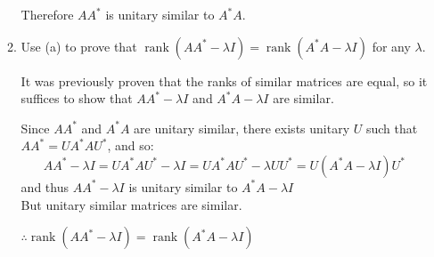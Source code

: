 \documentclass[letterpaper,12pt,fleqn]{article}
\DeclareMathOperator{\rnk}{rank}
\renewcommand{\l}{\lambda}
\newcommand{\m}{\mu}
\begin{document}
\begin{enumerate}
\begin{enumerate}
    Therefore $AA^*$ is unitary similar to $A^*A$.
    

  \item Use (a) to prove that $\rnk(AA^*-\l I)=\rnk(A^*A-\l I)$ for any $\l$.

    It was previously proven that the ranks of similar matrices are equal, so it
    suffices to show that $AA^*-\l I$ and $A^*A-\l I$ are similar.

    Since $AA^*$ and $A^*A$ are unitary similar, there exists unitary $U$ such that
    $AA^*=UA^*AU^*$, and so:
    \[AA^*-\l I=UA^*AU^*-\l I=UA^*AU^*-\l UU^*=U(A^*A-\l I)U^*\]
    and thus $AA^*-\l I$ is unitary similar to $A^*A-\l I$ \\
    But unitary similar matrices are similar.

    $\therefore \rnk(AA^*-\l I)=\rnk(A^*A-\l I)$
  \end{enumerate}

  \newpage

  \newcommand{\JA}{\begin{bmatrix} \l & 0 & 0 \\ 0 & \l & 0 \\ 0 & 0 & \l \end{bmatrix}}
  \newcommand{\JB}{\begin{bmatrix} \l & 1 & 0 \\ 0 & \l & 0 \\ 0 & 0 & \l \end{bmatrix}}
  \newcommand{\JC}{\begin{bmatrix} \l & 1 & 0 \\ 0 & \l & 1 \\ 0 & 0 & \l \end{bmatrix}}

  \newcommand{\JD}{\begin{bmatrix} \l & 0 & 0 \\ 0 & \m & 0 \\ 0 & 0 & \m \end{bmatrix}}
  \newcommand{\JE}{\begin{bmatrix} \l & 0 & 0 \\ 0 & \m & 1 \\ 0 & 0 & \m \end{bmatrix}}
  \newcommand{\JF}{\begin{bmatrix} \l & 0 & 0 \\ 0 & \l & 0 \\ 0 & 0 & \m \end{bmatrix}}
  \newcommand{\JG}{\begin{bmatrix} \l & 1 & 0 \\ 0 & \l & 0 \\ 0 & 0 & \m \end{bmatrix}}


\end{enumerate}
\end{document}
